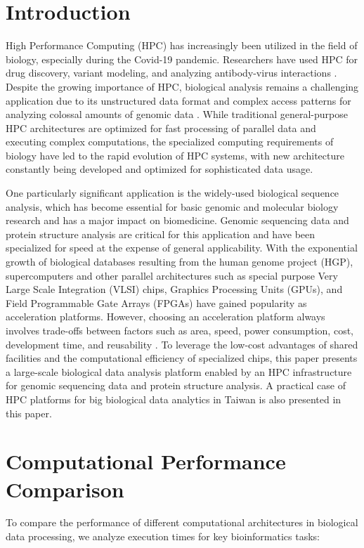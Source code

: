 \documentclass[conference]{IEEEtran}
\begin{document}
\section*{\textbf{Introduction}}
High Performance Computing (HPC) has increasingly been utilized in the field of biology, especially during the Covid-19 pandemic. Researchers have used HPC for drug discovery, variant modeling, and analyzing antibody-virus interactions \cite{b1}. Despite the growing importance of HPC, biological analysis remains a challenging application due to its unstructured data format and complex access patterns for analyzing colossal amounts of genomic data \cite{b2}. While traditional general-purpose HPC architectures are optimized for fast processing of parallel data and executing complex computations, the specialized computing requirements of biology have led to the rapid evolution of HPC systems, with new architecture constantly being developed and optimized for sophisticated data usage.

One particularly significant application is the widely-used biological sequence analysis, which has become essential for basic genomic and molecular biology research and has a major impact on biomedicine. Genomic sequencing data and protein structure analysis are critical for this application and have been specialized for speed at the expense of general applicability. With the exponential growth of biological databases resulting from the human genome project (HGP), supercomputers and other parallel architectures such as special purpose Very Large Scale Integration (VLSI) chips, Graphics Processing Units (GPUs), and Field Programmable Gate Arrays (FPGAs) have gained popularity as acceleration platforms. However, choosing an acceleration platform always involves trade-offs between factors such as area, speed, power consumption, cost, development time, and reusability \cite{b3}. To leverage the low-cost advantages of shared facilities and the computational efficiency of specialized chips, this paper presents a large-scale biological data analysis platform enabled by an HPC infrastructure for genomic sequencing data and protein structure analysis. A practical case of HPC platforms for big biological data analytics in Taiwan is also presented in this paper.

\section*{\textbf{Computational Performance Comparison}}
To compare the performance of different computational architectures in biological data processing, we analyze execution times for key bioinformatics tasks:
\end{document}
